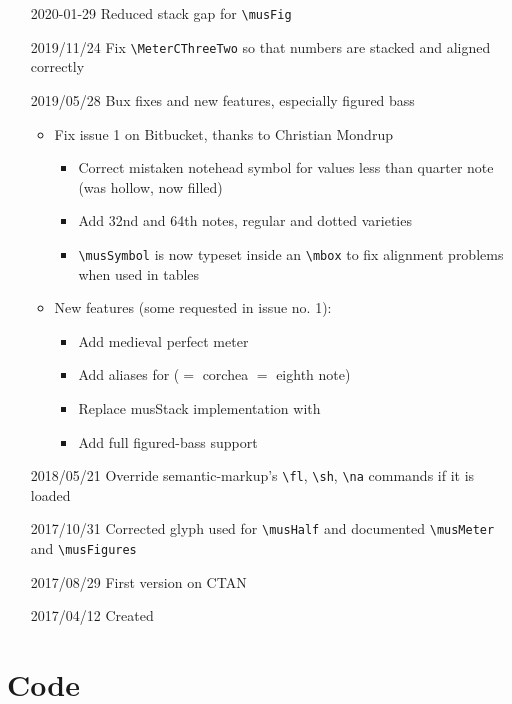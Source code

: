 \documentclass{article}
\begin{document}
\begin{itemize}
    \item[2020-01-29] Reduced stack gap for \verb|\musFig|
    \item[2019/11/24] Fix \verb|\MeterCThreeTwo| so that numbers are stacked
        and aligned correctly
    \item[2019/05/28] Bux fixes and new features, especially figured bass
        \begin{itemize}
            \item Fix issue 1 on Bitbucket, thanks to Christian Mondrup
                \begin{itemize}
                    \item Correct mistaken notehead symbol for values less than
                        quarter note (was hollow, now filled)
                    \item Add 32nd and 64th notes, regular and dotted varieties
                    \item \verb|\musSymbol| is now typeset inside an
                        \verb|\mbox| to fix alignment problems when used in
                        tables
                \end{itemize}
            \item New features (some requested in issue no. 1):
                \begin{itemize}
                    \item Add medieval perfect meter
                    \item Add aliases for  ($=$ corchea $=$ eighth note)
                    \item Replace musStack implementation with 
                    \item Add full figured-bass support
                \end{itemize}
        \end{itemize}
    \item[2018/05/21] Override semantic-markup's \verb|\fl|, \verb|\sh|,
        \verb|\na| commands if it is loaded
    \item[2017/10/31] Corrected glyph used for \verb|\musHalf| and documented
        \verb|\musMeter| and \verb|\musFigures|
    \item[2017/08/29] First version on CTAN
    \item[2017/04/12] Created
\end{itemize}

\section{Code}

\end{document}

